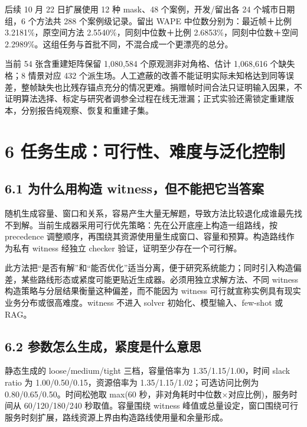 \documentclass[UTF8,10pt,a4paper,fontset=fandol]{ctexart}
\begin{document}
后续 10 月 22 日扩展使用 12 种 mask、48 个案例，开发/\allowbreak{}留出各 24 个城市日期组，6 个方法共 288 个案例级记录。留出 WAPE 中位数分别为：最近帧＋比例 3.2181\%，原空间方法 2.5540\%，同刻中位数＋比例 2.6853\%，同刻中位数＋空间 2.2989\%。这组任务与首批不同，不混合成一个更漂亮的总分。


当前 54 张含重建矩阵保留 1,080,584 个原观测非对角格、估计 1,068,616 个缺失格；8 情景对应 432 个派生场。人工遮蔽的改善不能证明实际未知格达到同等误差，整帧缺失也比残存锚点充分的情况更难。捐赠帧时间合法只证明输入因果，不证明算法选择、标定与研究者调参全过程在线无泄漏；正式实验还需锁定重建版本，分别报告纯观察、恢复和重建子集。


\section*{6 任务生成：可行性、难度与泛化控制}


\subsection*{6.1 为什么用构造 witness，但不能把它当答案}


随机生成容量、窗口和关系，容易产生大量无解题，导致方法比较退化成谁最先找不到解。当前生成器采用可行优先策略：先在公开底座上构造一组路线，按 precedence 调整顺序，再围绕其资源使用量生成窗口、容量和预算。构造路线作为私有 witness 经独立 checker 验证，证明至少存在一个可行解。


此方法把“是否有解”和“能否优化”适当分离，便于研究系统能力；同时引入构造偏差，某些路线形态或紧度可能更贴近生成器。必须用独立求解方法、不同 witness 构造策略与分层结果衡量这种偏差，而不能因为 witness 可行就宣称实例具有现实业务分布或很高难度。witness 不进入 solver 初始化、模型输入、few-shot 或 RAG。


\subsection*{6.2 参数怎么生成，紧度是什么意思}


静态生成的 loose/\allowbreak{}medium/\allowbreak{}tight 三档，容量倍率为 1.35/\allowbreak{}1.15/\allowbreak{}1.00，时间 slack ratio 为 1.00/\allowbreak{}0.50/\allowbreak{}0.15，资源倍率为 1.35/\allowbreak{}1.15/\allowbreak{}1.02；可选访问比例为 0.80/\allowbreak{}0.65/\allowbreak{}0.50。时间松弛取 max(60 秒，非对角耗时中位数\ensuremath{\times}对应比例)，服务时间从 60/\allowbreak{}120/\allowbreak{}180/\allowbreak{}240 秒取值。容量围绕 witness 峰值或总量设定，窗口围绕可行服务时刻扩展，路线资源上界由构造路线使用量和余量形成。
\end{document}
